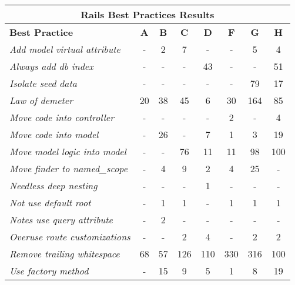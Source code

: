 \begin{table}[H]
\begin{center}{\scriptsize
  \begin{threeparttable}
  \begin{tabular}{|l||c|c|c|c|c|c|c|} \hline
  \multicolumn{8}{|c|}{Rails Best Practices Results} \\ \hline
  \textbf{Best Practice}& \textbf{A}& \textbf{B}& \textbf{C}&  \textbf{D}& \textbf{F}& \textbf{G}& \textbf{H} \\\hline\hline
  \emph{\tnote{a}Add model virtual attribute           }              &   -  &   2  &   7  &   - &   - &   5 &   4  \\ \hline
  \emph{Always add db index                   }              &   -  &   -  &   -  &  43 &   - &   - &  51  \\ \hline
  \emph{Isolate seed data                     }              &   -  &   -  &   -  &   - &   - &  79 &  17  \\ \hline
  \emph{Law of demeter                        }              &  20  &  38  &  45  &   6 &  30 & 164 &  85  \\ \hline
  \emph{Move code into controller             }              &   -  &   -  &   -  &   - &   2 &   - &   4  \\ \hline
  \emph{Move code into model                  }              &   -  &  26  &   -  &   7 &   1 &   3 &  19  \\ \hline
  \emph{Move model logic into model           }              &   -  &   -  &  76  &  11 &  11 &  98 & 100  \\ \hline
  \emph{Move finder to named\_scope           }              &   -  &   4  &   9  &   2 &   4 &  25 &   -  \\ \hline
  \emph{Needless deep nesting                 }              &   -  &   -  &   -  &   1 &   - &   - &   -  \\ \hline
  \emph{Not use default root                  }              &   -  &   1  &   1  &   - &   1 &   1 &   1  \\ \hline
  \emph{Notes  use query attribute            }              &   -  &   2  &   -  &   - &   - &   - &   -  \\ \hline
  \emph{Overuse route customizations          }              &   -  &   -  &   2  &   4 &   - &   2 &   2  \\ \hline
  \emph{Remove trailing whitespace            }              &  68  &  57  & 126  & 110 & 330 & 316 & 100  \\ \hline
  \emph{Use factory method                    }              &   -  &  15  &   9  &   5 &   1 &   8 &  19  \\ \hline

\end{tabular}
\end{threeparttable}}
\end{center}
\end{table}

